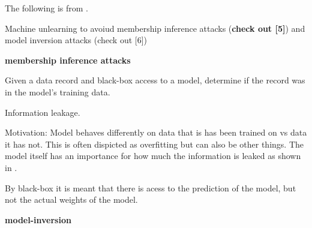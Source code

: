 The following is from \cite{xu_machine_2023}.

Machine unlearning to avoiud membership inference attacks (\textbf{check out [5]}) and model inversion attacks (check out [6])

\textbf{membership inference attacks}

Given a data record and black-box access to a model, determine if the record was in the model's training data. 

Information leakage.

Motivation: Model behaves differently on data that is has been trained on vs data it has not. This is often dispicted as overfitting but can also be other things. The model itself has an importance for how much the information is leaked as shown in \cite{shokri_membership_2017}. 

By black-box it is meant that there is acess to the prediction of the model, but not the actual weights of the model. 




\textbf{model-inversion}


\cite{fredrikson_model_2015}




